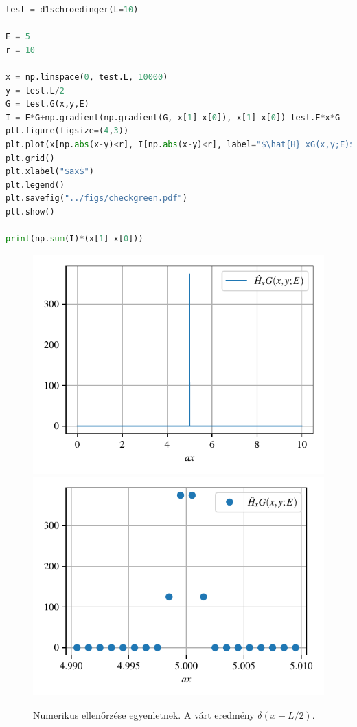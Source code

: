 \begin{lstlisting}[language=Python]
test = d1schroedinger(L=10)

E = 5
r = 10

x = np.linspace(0, test.L, 10000)
y = test.L/2
G = test.G(x,y,E)
I = E*G+np.gradient(np.gradient(G, x[1]-x[0]), x[1]-x[0])-test.F*x*G
plt.figure(figsize=(4,3))
plt.plot(x[np.abs(x-y)<r], I[np.abs(x-y)<r], label="$\hat{H}_xG(x,y;E)$")
plt.grid()
plt.xlabel("$ax$")
plt.legend()
plt.savefig("../figs/checkgreen.pdf")
plt.show()

print(np.sum(I)*(x[1]-x[0]))
\end{lstlisting}

\begin{figure}[H]
	\centering
	\includegraphics[scale=1]{./figs/checkgreen.pdf}
	\includegraphics[scale=1]{./figs/checkgreen2.pdf}
	\label{numeric:checkgreen}
	\caption[Green-függvény numerikus ellenőrzése]{Numerikus ellenőrzése  egyenletnek. A várt eredmény $\delta(x-L/2)$.}
\end{figure}